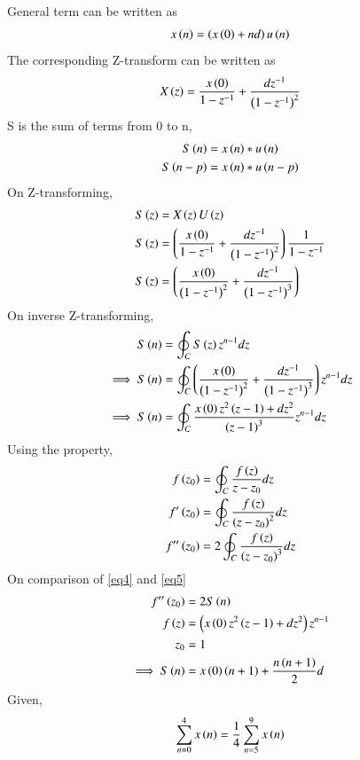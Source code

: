 \documentclass[journal,12pt,twocolumn]{IEEEtran}
\theoremstyle{remark}
\begin{document}
General term can be written as
\begin{align}
    x\left(n\right) = \left(x\left(0\right) + nd\right)u\left(n\right)
\end{align}
The corresponding Z-transform can be written as 
\begin{align}
    X\left(z\right) = \frac{x\left(0\right)}{1 - z^{-1}} + \frac{dz^{-1}}{\left(1 - z^{-1}\right)^{2}} \label{eq2}
\end{align}
S is the sum of terms from 0 to n,
    \begin{align}
        S\left(n\right) &= x\left(n\right) * u\left(n\right)\\
        S\left(n-p\right) &= x\left(n\right) * u\left(n-p\right)
    \end{align}
On Z-transforming,
    \begin{align}
        S\left(z\right) &= X\left(z\right)U\left(z\right)\\
        S\left(z\right) &= \left(\frac{x\left(0\right)}{1 - z^{-1}} + \frac{dz^{-1}}{\left(1 - z^{-1}\right)^{2}}\right)\frac{1}{1-z^{-1}}\\
        S\left(z\right) &= \left(\frac{x\left(0\right)}{\left(1 - z^{-1}\right)^2} + \frac{dz^{-1}}{\left(1 - z^{-1}\right)^{3}}\right)
    \end{align}
On inverse Z-transforming, 
    \begin{align}
        S\left(n\right) &= \oint_{C} S\left(z\right)z^{n-1}dz\\
        \implies S\left(n\right) &= \oint_{C} \left(\frac{x\left(0\right)}{\left(1 - z^{-1}\right)^2} + \frac{dz^{-1}}{\left(1 - z^{-1}\right)^{3}}\right) z^{n-1} dz\\
        \implies S\left(n\right) &= \oint_{C} \frac{x\left(0\right)z^{2}\left(z-1\right)+dz^{2}}{\left(z-1\right)^{3}}z^{n-1}dz \label{eq4}
    \end{align}
Using the property, 
    \begin{align}
        f\left(z_0\right) &= \oint_{C} \frac{f\left(z\right)}{z-z_0}dz\\
        f'\left(z_0\right) &= \oint_{C} \frac{f\left(z\right)}{\left(z-z_0\right)^{2}}dz\\
        f''\left(z_0\right) &= 2\oint_{C} \frac{f\left(z\right)}{\left(z-z_0\right)^{3}}dz \label{eq5}
    \end{align}
On comparison of \eqref{eq4} and \eqref{eq5}
    \begin{align}
        f''\left(z_0\right) &= 2S\left(n\right)\\
        f\left(z\right) &= \left(x\left(0\right)z^2\left(z-1\right)+dz^2\right)z^{n-1}\\
        z_0 &= 1\\
        \implies S\left(n\right) &= x\left(0\right)\left(n+1\right) + \frac{n\left(n+1\right)}{2}d
    \end{align}
Given, 
   \begin{align}
       \sum_{n=0}^{4}x\left(n\right) = \frac{1}{4}\sum_{n=5}^{9}x\left(n\right)
   \end{align}
\end{document}
